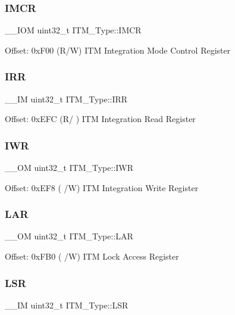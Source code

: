 \subsubsection{\texorpdfstring{IMCR}{IMCR}}
{\footnotesize\ttfamily \+\_\+\+\_\+\+I\+OM uint32\+\_\+t I\+T\+M\+\_\+\+Type\+::\+I\+M\+CR}

Offset\+: 0x\+F00 (R/W) I\+TM Integration Mode Control Register \mbox{\label{struct_i_t_m___type_a66eb82a070953f09909f39b8e516fb91}} 
\subsubsection{\texorpdfstring{IRR}{IRR}}
{\footnotesize\ttfamily \+\_\+\+\_\+\+IM uint32\+\_\+t I\+T\+M\+\_\+\+Type\+::\+I\+RR}

Offset\+: 0x\+E\+FC (R/ ) I\+TM Integration Read Register \mbox{\label{struct_i_t_m___type_aa9da04891e48d1a2f054de186e9c4c94}} 
\subsubsection{\texorpdfstring{IWR}{IWR}}
{\footnotesize\ttfamily \+\_\+\+\_\+\+OM uint32\+\_\+t I\+T\+M\+\_\+\+Type\+::\+I\+WR}

Offset\+: 0x\+E\+F8 ( /W) I\+TM Integration Write Register \mbox{\label{struct_i_t_m___type_a7f9c2a2113a11c7f3e98915f95b669d5}} 
\subsubsection{\texorpdfstring{LAR}{LAR}}
{\footnotesize\ttfamily \+\_\+\+\_\+\+OM uint32\+\_\+t I\+T\+M\+\_\+\+Type\+::\+L\+AR}

Offset\+: 0x\+F\+B0 ( /W) I\+TM Lock Access Register \mbox{\label{struct_i_t_m___type_a3861c67933a24dd6632288c4ed0b80c8}} 
\subsubsection{\texorpdfstring{LSR}{LSR}}
{\footnotesize\ttfamily \+\_\+\+\_\+\+IM uint32\+\_\+t I\+T\+M\+\_\+\+Type\+::\+L\+SR}

